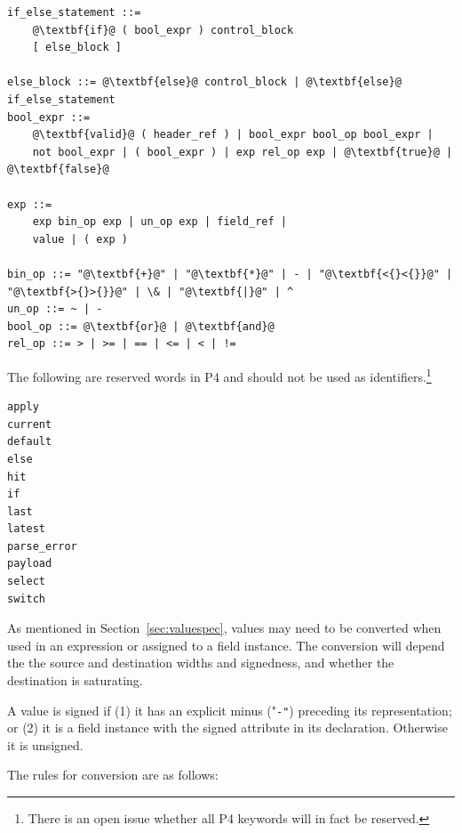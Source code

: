 \documentclass[12pt]{article}
\begin{document}
\begin{lstlisting}[frame=single,backgroundcolor=\color{bnfgreen},escapechar=\@]
if_else_statement ::=
    @\textbf{if}@ ( bool_expr ) control_block
    [ else_block ]

else_block ::= @\textbf{else}@ control_block | @\textbf{else}@ if_else_statement
bool_expr ::=
    @\textbf{valid}@ ( header_ref ) | bool_expr bool_op bool_expr |
    not bool_expr | ( bool_expr ) | exp rel_op exp | @\textbf{true}@ | @\textbf{false}@

exp ::=
    exp bin_op exp | un_op exp | field_ref |
    value | ( exp )

bin_op ::= "@\textbf{+}@" | "@\textbf{*}@" | - | "@\textbf{<{}<{}}@" | "@\textbf{>{}>{}}@" | \& | "@\textbf{|}@" | ^
un_op ::= ~ | -
bool_op ::= @\textbf{or}@ | @\textbf{and}@
rel_op ::= > | >= | == | <= | < | !=

\end{lstlisting}


The following are reserved words in P4 and should not be used as identifiers.\footnote{There is an open issue whether all P4 keywords will in fact be reserved.}

\begin{Verbatim}[commandchars=\\\{\}]
apply
current
default
else
hit
if
last
latest
parse_error
payload
select
switch
\end{Verbatim}



As mentioned in Section~\ref{sec:valuespec}, values may need to be 
converted when used in an expression or assigned to a field instance. The 
conversion will depend the the source and destination widths and signedness, 
and whether the destination is saturating. 

A value is signed if (1) it has an explicit minus ("\texttt{-"}) preceding its representation; 
or (2) it is a field instance with the signed attribute in its declaration. 
Otherwise it is unsigned.

The rules for conversion are as follows:
\end{document}
